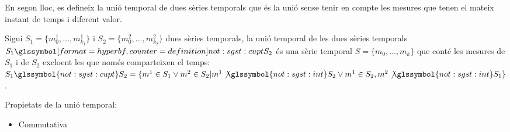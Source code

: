 En segon lloc, es defineix la unió temporal de dues sèries temporals
que és la unió sense tenir en compte les mesures que tenen el mateix
instant de temps i diferent valor.
\begin{definition}
  Sigui $S_1=\{m_0^1, \dotsc, m_{k_1}^1\}$ i $S_2=\{m_0^2, \dotsc,
  m_{k_2}^2\}$ dues sèries temporals, la unió temporal de les dues
  sèries temporals $S_1 \glssymboldef{not:sgst:cupt} S_2$ és una sèrie
  temporal $S=\{m_0, \dotsc, m_k\}$ que conté les mesures de $S_1$ i
  de $S_2$ excloent les que només comparteixen el temps: $S_1
  \glssymbol{not:sgst:cupt} S_2 = \{ m^1 \in S_1 \vee m^2 \in S_2 |
  m^1 \not\glssymbol{not:sgst:int} S_2 \vee m^1 \in S_2, m^2
  \not\glssymbol{not:sgst:int} S_1 \}$.
\end{definition}


Propietats de la unió temporal:
\begin{itemize}
\item Commutativa
\end{itemize}




